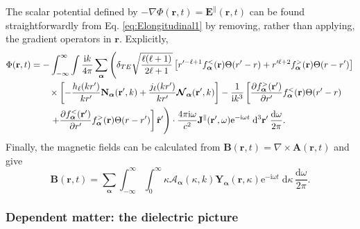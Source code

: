 \documentclass{article}
\begin{document}
The scalar potential defined by $-\nabla \Phi(\mathbf{r},t) = \mathbf{E}^\parallel(\mathbf{r},t)$ can be found straightforwardly from Eq. \eqref{eq:Elongitudinal1} by removing, rather than applying, the gradient operators in $\mathbf{r}$. Explicitly,
\begin{equation}
\begin{split}
\Phi(\mathbf{r},t) &= -\int_{-\infty}^\infty\int\frac{\mathrm{i}k}{4\pi}\sum_{\bm{\alpha}}\left(\delta_{TE}\sqrt{\frac{\ell(\ell + 1)}{2\ell + 1}}\left[r'^{-\ell + 1}f_{\bm{\alpha}}^<(\mathbf{r})\Theta(r' - r) + r'^{\ell + 2}f_{\bm{\alpha}}^>(\mathbf{r})\Theta(r - r')\right]\right.\\
&\qquad\times\left[-\frac{h_\ell(kr')}{kr'}\mathbf{N}_{\bm{\alpha}}(\mathbf{r}',k) + \frac{j_\ell(kr')}{kr'}\bm{\mathcal{N}}_{\bm{\alpha}}(\mathbf{r}',k)\right] - \frac{1}{\mathrm{i} k^3}\left[\frac{\partial f_{\bm{\alpha}}^>(\mathbf{r}')}{\partial r'}f_{\bm{\alpha}}^<(\mathbf{r})\Theta(r' - r)\right.\\
&\qquad\left.\left. + \frac{\partial f_{\bm{\alpha}}^<(\mathbf{r}')}{\partial r'}f_{\bm{\alpha}}^>(\mathbf{r})\Theta(r - r')\right]\hat{\mathbf{r}}' \vphantom{\sqrt{\frac{\ell(\ell + 1)}{2\ell + 1}}} \right)\cdot\frac{4\pi\mathrm{i}\omega}{c^2}\mathbf{J}^\parallel(\mathbf{r}',\omega)\mathrm{e}^{-\mathrm{i}\omega t}\;\mathrm{d}^3\mathbf{r'}\,\frac{\mathrm{d}\omega}{2\pi}.
\end{split}
\end{equation}
Finally, the magnetic fields can be calculated from $\mathbf{B}(\mathbf{r},t) = \nabla\times\mathbf{A}(\mathbf{r},t)$ and give
\begin{equation}
\mathbf{B}(\mathbf{r},t) = \sum_{\bm{\alpha}}\int_{-\infty}^\infty\int_0^\infty\kappa\mathcal{A}_{\bm{\alpha}}(\kappa,k)\mathbf{Y}_{\bm{\alpha}}(\mathbf{r},\kappa)\mathrm{e}^{-\mathrm{i}\omega t}\;\mathrm{d}\kappa\,\frac{\mathrm{d}\omega}{2\pi}.
\end{equation}











\subsubsection{Dependent matter: the dielectric picture}\label{sec:dependentMatter}
\end{document}
